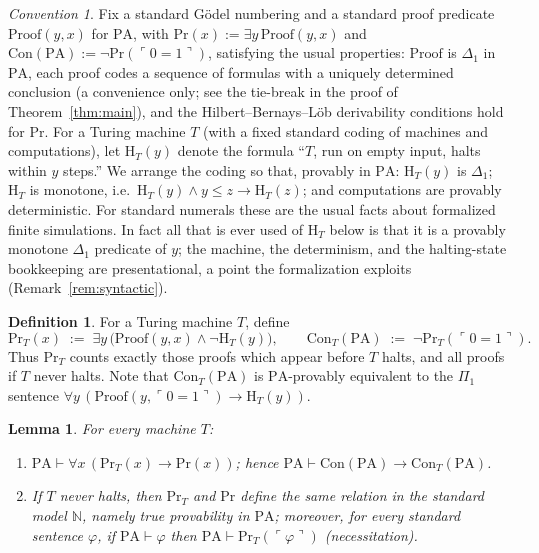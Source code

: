 \documentclass[11pt]{amsart}
\newtheorem{lemma}[theorem]{Lemma}
\theoremstyle{definition}
\newtheorem{definition}[theorem]{Definition}
\theoremstyle{remark}
\newtheorem{convention}[theorem]{Convention}
\newcommand{\PA}{\mathrm{PA}}
\newcommand{\Con}{\mathrm{Con}}
\newcommand{\Pf}{\mathrm{Proof}}
\newcommand{\Prov}{\mathrm{Pr}}
\newcommand{\HT}[1]{\mathrm{H}_{#1}}
\newcommand{\godel}[1]{\ulcorner #1 \urcorner}
\newcommand{\N}{\mathbb{N}}
\begin{document}
\begin{convention}\label{conv:coding}
Fix a standard G\"odel numbering and a standard proof predicate
$\Pf(y,x)$ for $\PA$, with $\Prov(x):=\exists y\,\Pf(y,x)$ and
$\Con(\PA):=\neg\Prov(\godel{0{=}1})$, satisfying the usual properties:
$\Pf$ is $\Delta_1$ in $\PA$, each proof codes a sequence of formulas
with a uniquely determined conclusion (a convenience only; see the
tie-break in the proof of Theorem~\ref{thm:main}), and the
Hilbert--Bernays--L\"ob derivability conditions hold for $\Prov$. For a
Turing machine $T$ (with a fixed standard coding of machines and
computations), let $\HT{T}(y)$ denote the formula ``$T$, run on empty
input, halts within $y$ steps.'' We arrange the coding so that, provably
in $\PA$: $\HT{T}(y)$ is $\Delta_1$; $\HT{T}$ is monotone, i.e.\
$\HT{T}(y)\wedge y\le z\to\HT{T}(z)$; and computations are provably
deterministic. For standard numerals these are the usual facts about
formalized finite simulations. In fact all that is ever used of
$\HT{T}$ below is that it is a provably monotone $\Delta_1$ predicate of
$y$; the machine, the determinism, and the halting-state bookkeeping are
presentational, a point the formalization exploits
(Remark~\ref{rem:syntactic}). %
\end{convention}

\begin{definition}\label{def:PrT}
For a Turing machine $T$, define
\[
\Prov_T(x) \;:=\; \exists y\,\bigl(\Pf(y,x)\wedge\neg\HT{T}(y)\bigr),
\qquad
\Con_T(\PA) \;:=\; \neg\Prov_T(\godel{0{=}1}).
\]
Thus $\Prov_T$ counts exactly those proofs which appear before $T$ halts,
and all proofs if $T$ never halts. Note that $\Con_T(\PA)$ is
$\PA$-provably equivalent to the $\Pi_1$ sentence
$\forall y\,(\Pf(y,\godel{0{=}1})\to\HT{T}(y))$.
\end{definition}

\begin{lemma}\label{lem:sub}
For every machine $T$:
\begin{enumerate}
\item $\PA\vdash\forall x\,(\Prov_T(x)\to\Prov(x))$; hence
      $\PA\vdash\Con(\PA)\to\Con_T(\PA)$.
\item If $T$ never halts, then $\Prov_T$ and $\Prov$ define the same
      relation in the standard model $\N$, namely true provability in
      $\PA$; moreover, for every standard sentence $\varphi$, if
      $\PA\vdash\varphi$ then $\PA\vdash\Prov_T(\godel{\varphi})$
      (necessitation).
\end{enumerate}
\end{lemma}
\end{document}
